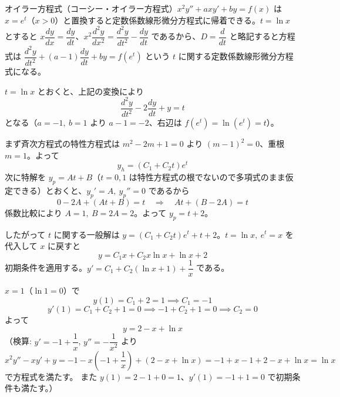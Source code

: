 
オイラー方程式（コーシー・オイラー方程式）$x^{2}y'' + axy' + by = f(x)$ は $x = e^{t}$（$x>0$）と置換すると定数係数線形微分方程式に帰着できる。$t=\ln x$ とすると $x\dfrac{dy}{dx}=\dfrac{dy}{dt}$、$x^{2}\dfrac{d^{2}y}{dx^{2}}=\dfrac{d^{2}y}{dt^{2}}-\dfrac{dy}{dt}$ であるから、$D=\dfrac{d}{dt}$ と略記すると方程式は $\dfrac{d^{2}y}{dt^{2}}+(a-1)\dfrac{dy}{dt}+by=f(e^{t})$ という $t$ に関する定数係数線形微分方程式になる。

$t = \ln x$ とおくと、上記の変換により
\[
\frac{d^{2}y}{dt^{2}} - 2\frac{dy}{dt} + y = t
\]
となる（$a=-1,\ b=1$ より $a-1=-2$、右辺は $f(e^{t}) = \ln(e^{t}) = t$）。

まず斉次方程式の特性方程式は $m^{2}-2m+1=0$ より $(m-1)^{2}=0$、重根 $m=1$。よって
\[
y_{h} = (C_{1}+C_{2}t)e^{t}
\]
次に特解を $y_{p} = At+B$（$t=0,1$ は特性方程式の根でないので多項式のまま仮定できる）とおくと、$y_{p}'=A,\ y_{p}''=0$ であるから
\[
0 - 2A + (At+B) = t
\quad\Longrightarrow\quad
At + (B-2A) = t
\]
係数比較により $A=1,\ B=2A=2$。よって $y_{p} = t+2$。

したがって $t$ に関する一般解は $y = (C_{1}+C_{2}t)e^{t} + t + 2$。$t=\ln x,\ e^{t}=x$ を代入して $x$ に戻すと
\[
y = C_{1}x + C_{2}x\ln x + \ln x + 2
\]
初期条件を適用する。$y' = C_{1} + C_{2}(\ln x + 1) + \dfrac{1}{x}$ である。

$x=1$（$\ln 1 = 0$）で
\[
y(1) = C_{1} + 2 = 1 \implies C_{1} = -1
\]
\[
y'(1) = C_{1} + C_{2} + 1 = 0 \implies -1 + C_{2} + 1 = 0 \implies C_{2} = 0
\]
よって
\[
\boxed{\; y = 2 - x + \ln x \;}
\]
（検算: $y'=-1+\dfrac{1}{x}$, $y''=-\dfrac{1}{x^{2}}$ より
$x^{2}y'' - xy' + y = -1 - x\left(-1+\dfrac{1}{x}\right) + (2-x+\ln x) = -1 + x - 1 + 2 - x + \ln x = \ln x$ で方程式を満たす。
また $y(1)=2-1+0=1$、$y'(1)=-1+1=0$ で初期条件も満たす。）
